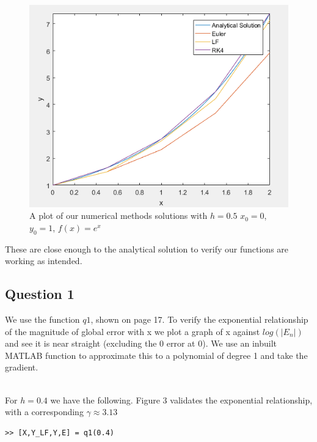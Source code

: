 \documentclass[10pt,a4paper]{report}
\begin{document}
\begin{figure}[H]
\centering
\includegraphics[scale=0.8]{test12}
\caption{A plot of our numerical methods solutions with $h=0.5$ $x_0=0$, $y_0=1$, $f(x)=e^x$}
\end{figure}

These are close enough to the analytical solution to verify our functions are working as intended.

\subsection*{Question 1}
We use the function $q1$, shown on page 17. To verify the exponential relationship of the magnitude of global error with x we plot a graph of x against $log(|E_n|)$ and see it is near straight (excluding the 0 error at 0). We use an inbuilt MATLAB function to approximate this to a polynomial of degree 1 and take the gradient. \\\

For $h=0.4$ we have the following. Figure 3 validates the exponential relationship, with a corresponding $\gamma\approx 3.13$

\begin{verbatim}
>> [X,Y_LF,Y,E] = q1(0.4)
\end{verbatim}
\end{document}
